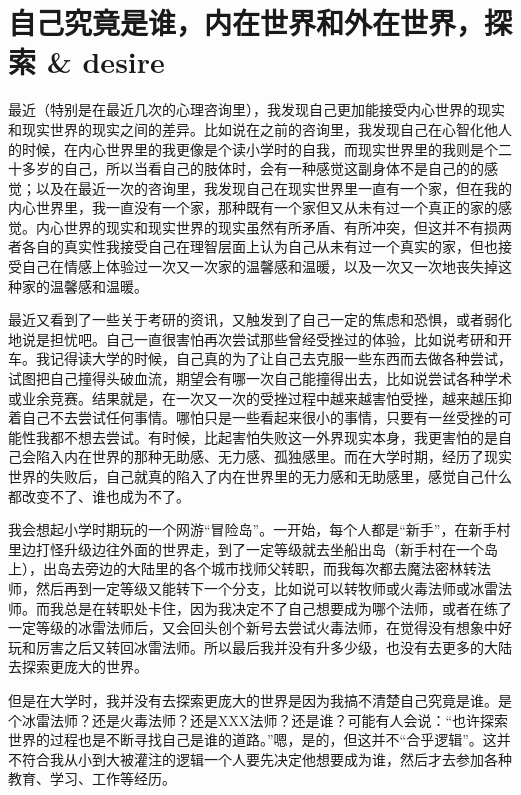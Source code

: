 \chapter{自己究竟是谁，内在世界和外在世界，探索 \& desire}



最近（特别是在最近几次的心理咨询里），我发现自己更加能接受内心世界的现实和现实世界的现实之间的差异。比如说在之前的咨询里，我发现自己在心智化他人的时候，在内心世界里的我更像是个读小学时的自我，而现实世界里的我则是个二十多岁的自己，所以当看自己的肢体时，会有一种感觉这副身体不是自己的的感觉；以及在最近一次的咨询里，我发现自己在现实世界里一直有一个家，但在我的内心世界里，我一直没有一个家，那种既有一个家但又从未有过一个真正的家的感觉。内心世界的现实和现实世界的现实虽然有所矛盾、有所冲突，但这并不有损两者各自的真实性\pozhehao{}我接受自己在理智层面上认为自己从未有过一个真实的家，但也接受自己在情感上体验过一次又一次家的温馨感和温暖，以及一次又一次地丧失掉这种家的温馨感和温暖。

最近又看到了一些关于考研的资讯，又触发到了自己一定的焦虑和恐惧，或者弱化地说是担忧吧。自己一直很害怕再次尝试那些曾经受挫过的体验，比如说考研和开车。我记得读大学的时候，自己真的为了让自己去克服一些东西而去做各种尝试，试图把自己撞得头破血流，期望会有哪一次自己能撞得出去，比如说尝试各种学术或业余竞赛。结果就是，在一次又一次的受挫过程中越来越害怕受挫，越来越压抑着自己不去尝试任何事情。哪怕只是一些看起来很小的事情，只要有一丝受挫的可能性我都不想去尝试。有时候，比起害怕失败这一外界现实本身，我更害怕的是自己会陷入内在世界的那种无助感、无力感、孤独感里。而在大学时期，经历了现实世界的失败后，自己就真的陷入了内在世界里的无力感和无助感里，感觉自己什么都改变不了、谁也成为不了。

我会想起小学时期玩的一个网游“冒险岛”。一开始，每个人都是“新手”，在新手村里边打怪升级边往外面的世界走，到了一定等级就去坐船出岛（新手村在一个岛上），出岛去旁边的大陆里的各个城市找师父转职，而我每次都去魔法密林转法师，然后再到一定等级又能转下一个分支，比如说可以转牧师或火毒法师或冰雷法师。而我总是在转职处卡住，因为我决定不了自己想要成为哪个法师，或者在练了一定等级的冰雷法师后，又会回头创个新号去尝试火毒法师，在觉得没有想象中好玩和厉害之后又转回冰雷法师。所以最后我并没有升多少级，也没有去更多的大陆去探索更庞大的世界。

但是在大学时，我并没有去探索更庞大的世界是因为我搞不清楚自己究竟是谁。是个冰雷法师？还是火毒法师？还是XXX法师？还是谁？可能有人会说：“也许探索世界的过程也是不断寻找自己是谁的道路。”嗯，是的，但这并不“合乎逻辑”。这并不符合我从小到大被灌注的逻辑\pozhehao{}一个人要先决定他想要成为谁，然后才去参加各种教育、学习、工作等经历。

